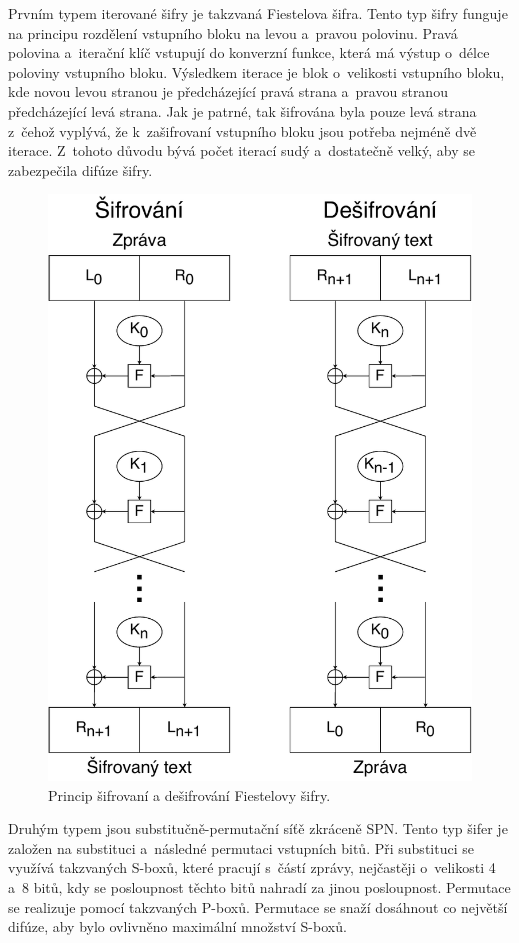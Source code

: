 Prvním typem iterované šifry je takzvaná Fiestelova šifra. Tento typ šifry funguje na principu rozdělení vstupního bloku na levou a~pravou polovinu. Pravá polovina a~iterační klíč vstupují do konverzní funkce, která má výstup o~délce poloviny vstupního bloku. Výsledkem iterace je blok o~velikosti vstupního bloku, kde novou levou stranou je předcházející pravá strana a~pravou stranou předcházející levá strana. Jak je patrné, tak šifrována byla pouze levá strana z~čehož vyplývá, že k~zašifrovaní vstupního bloku jsou potřeba nejméně dvě iterace. Z~tohoto důvodu bývá počet iterací sudý a~dostatečně velký, aby se zabezpečila difúze šifry.\cite{Burda9788021446120ISBN}
\newpage
\begin{figure}[!h]
  \begin{center}
    \includegraphics[scale=0.5]{obrazky/feistelCipher.pdf}
  \end{center}
  \caption[Fiestelova šifr]{Princip šifrovaní a dešifrování Fiestelovy šifry.\cite{FeistelCipher}}
  \label{img:FeistelCipher}
\end{figure}
Druhým typem jsou substitučně-permutační síťě zkráceně SPN. Tento typ šifer je založen na substituci a~následné permutaci vstupních bitů. Při substituci se využívá takzvaných S-boxů, které pracují s~částí zprávy, nejčastěji o~velikosti 4 a~8 bitů, kdy se posloupnost těchto bitů nahradí za jinou posloupnost. Permutace se realizuje pomocí takzvaných P-boxů. Permutace se snaží dosáhnout co největší difúze, aby bylo ovlivněno maximální množství S-boxů.%

